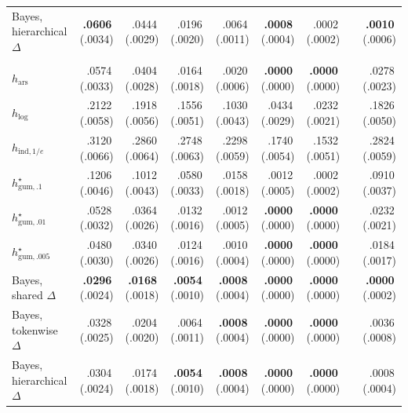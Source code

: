 \documentclass[11pt]{article}
\newcommand{\mcse}[2]{\mbox{#1\,{\fontsize{7}{8}\selectfont(#2)}}}
\newcommand{\bestmcse}[2]{\mbox{\textbf{#1}\,{\fontsize{7}{8}\selectfont(#2)}}}
\begin{document}
\begin{table}[htbp]
\begin{tabular}{@{}lrrrrrrcr@{}}
Bayes, hierarchical $\Delta$ & \bestmcse{.0606}{.0034} & \mcse{.0444}{.0029} & \mcse{.0196}{.0020} & \mcse{.0064}{.0011} & \bestmcse{.0008}{.0004} & \mcse{.0002}{.0002} & & \bestmcse{.0010}{.0006} \\
\addlinespace[4pt]
\multicolumn{9}{@{}l}{\textit{Horizon $n=60$}}\\[1pt]
$h_{\mathrm{ars}}$ & \mcse{.0574}{.0033} & \mcse{.0404}{.0028} & \mcse{.0164}{.0018} & \mcse{.0020}{.0006} & \bestmcse{.0000}{.0000} & \bestmcse{.0000}{.0000} & & \mcse{.0278}{.0023} \\
$h_{\log}$ & \mcse{.2122}{.0058} & \mcse{.1918}{.0056} & \mcse{.1556}{.0051} & \mcse{.1030}{.0043} & \mcse{.0434}{.0029} & \mcse{.0232}{.0021} & & \mcse{.1826}{.0050} \\
$h_{\mathrm{ind},1/e}$ & \mcse{.3120}{.0066} & \mcse{.2860}{.0064} & \mcse{.2748}{.0063} & \mcse{.2298}{.0059} & \mcse{.1740}{.0054} & \mcse{.1532}{.0051} & & \mcse{.2824}{.0059} \\
$h^\star_{\mathrm{gum},.1}$ & \mcse{.1206}{.0046} & \mcse{.1012}{.0043} & \mcse{.0580}{.0033} & \mcse{.0158}{.0018} & \mcse{.0012}{.0005} & \mcse{.0002}{.0002} & & \mcse{.0910}{.0037} \\
$h^\star_{\mathrm{gum},.01}$ & \mcse{.0528}{.0032} & \mcse{.0364}{.0026} & \mcse{.0132}{.0016} & \mcse{.0012}{.0005} & \bestmcse{.0000}{.0000} & \bestmcse{.0000}{.0000} & & \mcse{.0232}{.0021} \\
$h^\star_{\mathrm{gum},.005}$ & \mcse{.0480}{.0030} & \mcse{.0340}{.0026} & \mcse{.0124}{.0016} & \mcse{.0010}{.0004} & \bestmcse{.0000}{.0000} & \bestmcse{.0000}{.0000} & & \mcse{.0184}{.0017} \\
Bayes, shared $\Delta$ & \bestmcse{.0296}{.0024} & \bestmcse{.0168}{.0018} & \bestmcse{.0054}{.0010} & \bestmcse{.0008}{.0004} & \bestmcse{.0000}{.0000} & \bestmcse{.0000}{.0000} & & \bestmcse{.0000}{.0002} \\
Bayes, tokenwise $\Delta$ & \mcse{.0328}{.0025} & \mcse{.0204}{.0020} & \mcse{.0064}{.0011} & \bestmcse{.0008}{.0004} & \bestmcse{.0000}{.0000} & \bestmcse{.0000}{.0000} & & \mcse{.0036}{.0008} \\
Bayes, hierarchical $\Delta$ & \mcse{.0304}{.0024} & \mcse{.0174}{.0018} & \bestmcse{.0054}{.0010} & \bestmcse{.0008}{.0004} & \bestmcse{.0000}{.0000} & \bestmcse{.0000}{.0000} & & \mcse{.0008}{.0004} \\
\bottomrule
\end{tabular}
\end{table}
\end{document}
